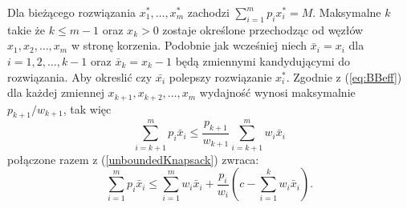 Dla bieżącego rozwiązania $x_1^*,\dots,x_m^*$ zachodzi $\sum_{i=1}^m p_ix_i^* = M$. Maksymalne $k$ takie że $ k \le m - 1$ oraz $x_k > 0$ zostaje określone przechodząc od węzłów $x_1,x_2,\dots,x_m$ w stronę korzenia. Podobnie jak wcześniej niech $\bar{x}_i = x_i$ dla $i=1,2,\dots,k-1$ oraz $\bar{x}_k = x_k -1$ będą zmiennymi kandydującymi do rozwiązania. Aby okreslić czy $\bar{x_i}$ polepszy rozwiązanie $x_i^*$. Zgodnie z (\cref{eq:BBeff}) dla każdej zmiennej $x_{k+1}, x_{k+2}, \dots, x_m$ wydajność wynosi maksymalnie $p_{k+1}/w_{k+1}$, tak więc
\begin{equation*}
  \sum_{i=k+1}^m p_i\bar{x}_i \le \frac{p_{k+1}}{w_{k+1}}\sum_{i=k+1}^m w_i \bar{x}_i
\end{equation*}
połączone razem z (\cref{unboundedKnapsack}) zwraca:
\begin{equation}
  \sum_{i=1}^m p_i\bar{x}_i \le \sum_{i=1}^m w_i \bar{x}_i + \frac{p_i}{w_{i}}( c - \sum_{i=1}^k w_i\bar{x}_i ).
\end{equation}

